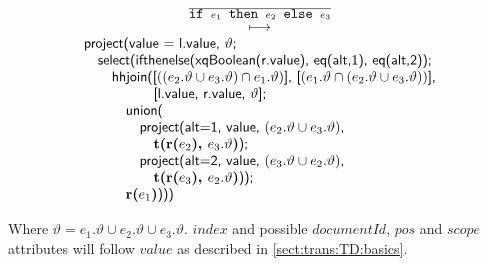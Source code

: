 \begin{equation}
\begin{array}{c}
\frac{}{\mbox{\texttt{if }}e_1\mbox{\texttt{ then }}e_2\mbox{\texttt{ else }}e_3} \\
\longmapsto \\
\begin{array}{l}
\mbox{\textsf{project(value = l.value, }}\vartheta\mbox{\textsf{;}} \\ \quad
\mbox{\textsf{select(ifthenelse(xqBoolean(r.value), eq(alt,1), eq(alt,2));}} \\ \quad \quad
\mbox{\textsf{hhjoin([}}((e_2.\vartheta \cup e_3.\vartheta)\cap e_1.\vartheta)\mbox{\textsf{],
[}}(e_1.\vartheta\cap (e_2.\vartheta\cup e_3.\vartheta))
\mbox{\textsf{],}} 
\\  \quad \quad \quad \quad \quad\mbox{\textsf{[l.value, r.value, }}\vartheta\mbox{\textsf{];}}\\\quad\quad\quad
\mbox{\textsf{union(}} \\ \quad\quad\quad\quad
\mbox{\textsf{project(alt=1, value, }}(e_2.\vartheta \cup e_3.\vartheta)\mbox{\textsf{,}}\\\quad\quad\quad\quad\quad
\mbox{\textbf{t(r(}}e_2\mbox{\textbf{), }}e_3.\vartheta\mbox{\textbf{)}\textsf{);}} \\ \quad\quad\quad\quad
\mbox{\textsf{project(alt=2, value, }}(e_3.\vartheta\cup e_2.\vartheta)\mbox{\textsf{,}}\\\quad\quad\quad\quad\quad
\mbox{\textbf{t(r(}}e_3\mbox{\textbf{), }}e_2.\vartheta\mbox{\textbf{)}\textsf{));}}\\\quad\quad\quad
\mbox{\textbf{r(}}e_1\mbox{\textbf{)}\textsf{)))}}
\end{array}
\end{array}
\label{rule:trans:TD:conditional}
\end{equation}

Where $\vartheta = e_1.\vartheta \cup e_2.\vartheta \cup e_3.\vartheta$. $index$ and possible $documentId$, $pos$
and $scope$ attributes will follow $value$ as described in \ref{sect:trans:TD:basics}.

